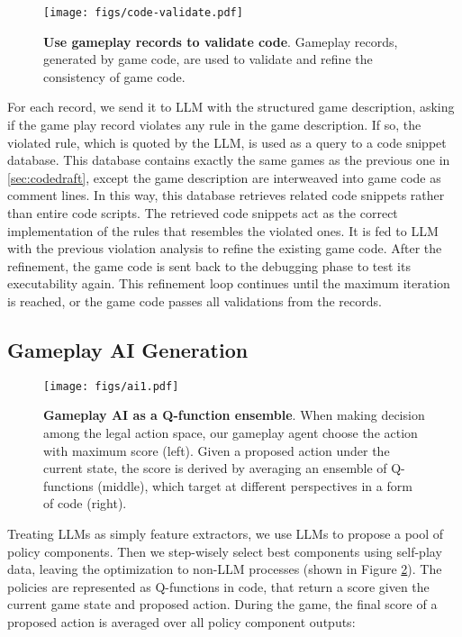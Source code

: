 \begin{figure}[ht]
  \centering
  \texttt{[image: figs/code-validate.pdf]}
  \caption{\textbf{Use gameplay records to validate code}. Gameplay records, generated by game code, are used to validate and refine the consistency of game code. }\label{fig:code-validate}
\end{figure}

For each record, we send it to LLM with the structured game description, asking if the game play record violates any rule in the game description. If so, the violated rule, which is quoted by the LLM, is used as a query to a code snippet database. This database contains exactly the same games as the previous one in \ref{sec:codedraft}, except the game description are interweaved into game code as comment lines. In this way, this database retrieves related code snippets rather than entire code scripts. The retrieved code snippets act as the correct implementation of the rules that resembles the violated ones. It is fed to LLM with the previous violation analysis to refine the existing game code. After the refinement, the game code is sent back to the debugging phase to test its executability again. This refinement loop continues until the maximum iteration is reached, or the game code passes all validations from the records.




\subsection{Gameplay AI Generation}
\label{sec:gameai}

\begin{figure}[ht]
    
  \centering
  \texttt{[image: figs/ai1.pdf]}
  \caption{\textbf{Gameplay AI as a Q-function ensemble}. When making decision among the legal action space, our gameplay agent choose the action with maximum score (left). Given a proposed action under the current state, the score is derived by averaging an ensemble of Q-functions (middle), which target at different perspectives in a form of code (right). }\label{fig:gameai_concept}
\end{figure}

Treating LLMs as simply feature extractors, we use LLMs to propose a pool of policy components. Then we step-wisely select best components using self-play data, leaving the optimization to non-LLM processes  (shown in Figure \ref{fig:gameai_concept}). The policies are represented as Q-functions in code, that return a score given the current game state and proposed action. During the game, the final score of a proposed action is averaged over all policy component outputs:

